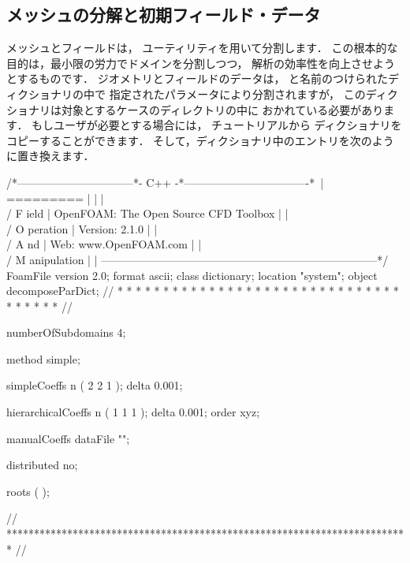 \subsection{メッシュの分解と初期フィールド・データ}
\label{ssec:3.4.1}
%
%
%
%
メッシュとフィールドは，
%
%
ユーティリティを用いて分割します．
この根本的な目的は，最小限の労力でドメインを分割しつつ，
解析の効率性を向上させようとするものです．
ジオメトリとフィールドのデータは，
%
%
と名前のつけられたディクショナリの中で
指定されたパラメータにより分割されますが，
このディクショナリは対象とするケースのディレクトリの中に
おかれている必要があります．
もしユーザが必要とする場合には，
チュートリアルから
ディクショナリをコピーすることができます．
そして，ディクショナリ中のエントリを次のように置き換えます．
\begin{OFverbatim}[file, linenum=17]
/*--------------------------------*- C++ -*----------------------------------*\
| =========                 |                                                 |
| \\      /  F ield         | OpenFOAM: The Open Source CFD Toolbox           |
|  \\    /   O peration     | Version:  2.1.0                                 |
|   \\  /    A nd           | Web:      www.OpenFOAM.com                      |
|    \\/     M anipulation  |                                                 |
\*---------------------------------------------------------------------------*/
FoamFile
{
    version     2.0;
    format      ascii;
    class       dictionary;
    location    "system";
    object      decomposeParDict;
}
// * * * * * * * * * * * * * * * * * * * * * * * * * * * * * * * * * * * * * //

numberOfSubdomains 4;

method          simple;

simpleCoeffs
{
    n               ( 2 2 1 );
    delta           0.001;
}

hierarchicalCoeffs
{
    n               ( 1 1 1 );
    delta           0.001;
    order           xyz;
}

manualCoeffs
{
    dataFile        "";
}

distributed     no;

roots           ( );


// ************************************************************************* //
\end{OFverbatim}
